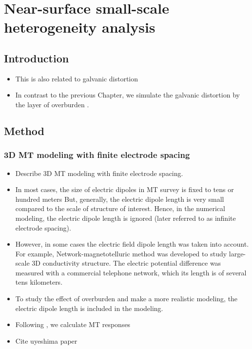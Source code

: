
\renewcommand{\thisdir}{_content/htr_intro}
\renewcommand{\figdir}{\thisdir/_fig}
\chapter{Near-surface small-scale heterogeneity analysis}

\section{Introduction}
\begin{itemize}
	\item This is also related to galvanic distortion
	\item In contrast to the previous Chapter, we simulate the galvanic distortion by the layer of overburden \citep[e.g.,][]{avdeeva2015a}.
\end{itemize}

\section{Method}
\subsection{3D MT modeling with finite electrode spacing}
	\begin{itemize}
		\item Describe 3D MT modeling with finite electrode spacing.
		\item In most cases, the size of electric dipoles in MT survey is fixed to tens or hundred meters 
		But, generally, the electric dipole length is very small compared to the scale of structure of interest. Hence, in the numerical modeling, the electric dipole length is ignored (later referred to as infinite electrode spacing).
		\item However, in some cases the electric field dipole length was taken into account. For example, Network-magnetotelluric method \citep{uyeshima2001a} was developed to study large-scale 3D conductivity structure. The electric potential difference was measured with a commercial telephone network, which its length is of several tens kilometers.
		\item To study the effect of overburden and make a more realistic modeling, the electric dipole length is included in the modeling. 
		\item Following \citet{uyeshima2001a}, we calculate MT responses
		\item Cite uyeshima paper
	\end{itemize}

